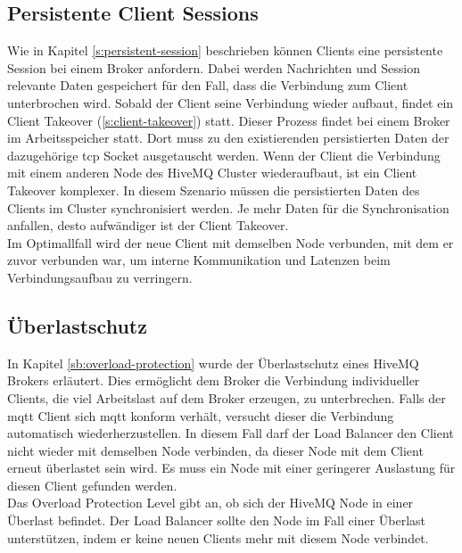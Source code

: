 \subsection{Persistente Client Sessions} \label{sp:persistent-session}
Wie in Kapitel \ref{s:persistent-session} beschrieben können Clients eine persistente Session bei einem Broker anfordern. Dabei werden Nachrichten und Session relevante Daten gespeichert für den Fall, dass die Verbindung zum Client unterbrochen wird. Sobald der Client seine Verbindung wieder aufbaut, findet ein Client Takeover (\ref{s:client-takeover}) statt.
Dieser Prozess findet bei einem Broker im Arbeitsspeicher statt.
Dort muss zu den existierenden persistierten Daten der dazugehörige \ac{tcp} Socket ausgetauscht werden.
Wenn der Client die Verbindung mit einem anderen Node des HiveMQ Cluster wiederaufbaut, ist ein Client Takeover komplexer.
In diesem Szenario müssen die persistierten Daten des Clients im Cluster synchronisiert werden.
Je mehr Daten für die Synchronisation anfallen, desto aufwändiger ist der Client Takeover.
\\
Im Optimallfall wird der neue Client mit demselben Node verbunden, mit dem er zuvor verbunden war, um interne Kommunikation und Latenzen beim Verbindungsaufbau zu verringern.

\subsection{Überlastschutz}
In Kapitel \ref{sb:overload-protection} wurde der Überlastschutz eines HiveMQ Brokers erläutert. Dies ermöglicht dem Broker die Verbindung individueller Clients, die viel Arbeitslast auf dem Broker erzeugen, zu unterbrechen. Falls der \ac{mqtt} Client sich \ac{mqtt} konform verhält, versucht dieser die Verbindung automatisch wiederherzustellen.
In diesem Fall darf der Load Balancer den Client nicht wieder mit demselben Node verbinden, da dieser Node mit dem Client erneut überlastet sein wird. Es muss ein Node mit einer geringerer Auslastung für diesen Client gefunden werden.
\\
Das Overload Protection Level gibt an, ob sich der HiveMQ Node in einer Überlast befindet. Der Load Balancer sollte den Node im Fall einer Überlast unterstützen, indem er keine neuen Clients mehr mit diesem Node verbindet.

